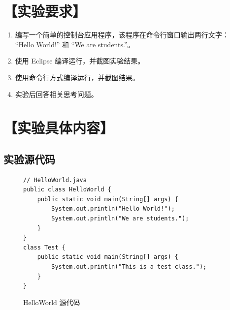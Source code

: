 \documentclass[12pt,a4paper]{article}
\begin{document}
\section*{【实验要求】}
\begin{enumerate}
    \item 编写一个简单的控制台应用程序，该程序在命令行窗口输出两行文字：\\
    “Hello World!” 和 “We are students.”。
    \item 使用 Eclipse 编译运行，并截图实验结果。
    \item 使用命令行方式编译运行，并截图结果。
    \item 实验后回答相关思考问题。
\end{enumerate}

\section*{【实验具体内容】}
\subsection*{实验源代码}
\begin{figure}[H]
\centering
\begin{lstlisting}
// HelloWorld.java
public class HelloWorld {
    public static void main(String[] args) {
        System.out.println("Hello World!");
        System.out.println("We are students.");
    }
}
class Test {
    public static void main(String[] args) {
        System.out.println("This is a test class.");
    }
}
\end{lstlisting}
\caption{HelloWorld 源代码}
\end{figure}
\end{document}
